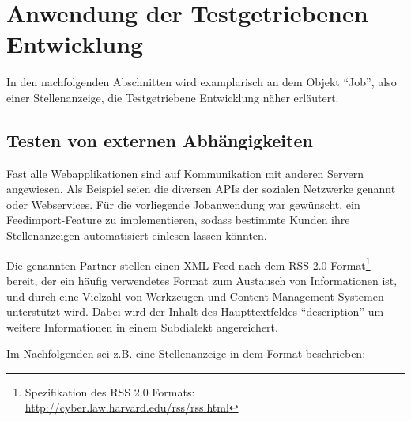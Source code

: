 \section{Anwendung der Testgetriebenen Entwicklung}

In den nachfolgenden Abschnitten wird examplarisch an dem Objekt "`Job"', also einer Stellenanzeige, die Testgetriebene Entwicklung näher erläutert.
    
    






\subsection{Testen von externen Abhängigkeiten}
Fast alle Webapplikationen sind auf Kommunikation mit anderen Servern angewiesen. Als Beispiel seien die diversen APIs der sozialen Netzwerke genannt oder Webservices. Für die vorliegende Jobanwendung war gewünscht, ein Feedimport-Feature zu implementieren, sodass bestimmte Kunden ihre Stellenanzeigen automatisiert einlesen lassen könnten.

Die genannten Partner stellen einen XML-Feed nach dem RSS 2.0 Format\footnote{Spezifikation des RSS 2.0 Formats: \url{http://cyber.law.harvard.edu/rss/rss.html}} bereit, der ein häufig verwendetes Format zum Austausch von Informationen ist, und durch eine Vielzahl von Werkzeugen und Content-Management-Systemen unterstützt wird.
Dabei wird der Inhalt des Haupttextfeldes "`description"' um weitere Informationen in einem Subdialekt angereichert. 
 
Im Nachfolgenden sei z.B. eine Stellenanzeige in dem Format beschrieben:

